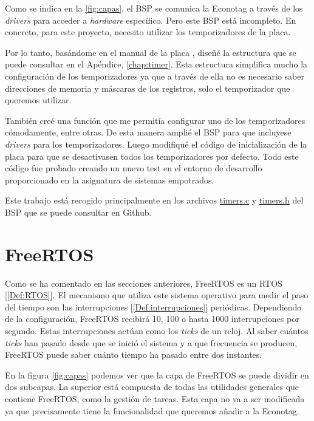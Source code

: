 Como se indica en la \autoref{fig:capas}, el BSP se comunica la Econotag a través de los \emph{drivers} para acceder a \emph{hardware} específico. Pero este BSP está incompleto. En concreto, para este proyecto, necesito utilizar los temporizadores de la placa.

Por lo tanto, basándome en el manual de la placa \cite{MC1322xRM}, diseñé la estructura que se puede consultar en el Apéndice, \autoref{chap:timer}. Esta estructura simplifica mucho la configuración de los temporizadores ya que a través de ella no es necesario saber direcciones de memoria y máscaras de los registros, solo el temporizador que queremos utilizar.

También creé una función que me permitía configurar uno de los temporizadores cómodamente, entre otras. De esta manera amplié el BSP para que incluyese \emph{drivers} para los temporizadores. Luego modifiqué el código de inicialización de la placa para que se desactivasen todos los temporizadores por defecto. Todo este código fue probado creando un nuevo test en el entorno de desarrollo proporcionado en la asignatura de sistemas empotrados.

Este trabajo está recogido principalmente en los archivos \href{https://github.com/epaubert/FreeRTOS-Kernel-TFG/blob/main/portable/GCC/ARM7_MC13224V/bsp/drivers/timers.c}{timers.c} y \href{https://github.com/epaubert/FreeRTOS-Kernel-TFG/blob/main/portable/GCC/ARM7_MC13224V/bsp/include/timers.h}{timers.h} del BSP que se puede consultar en Github.

\section{FreeRTOS}
Como se ha comentado en las secciones anteriores, FreeRTOS es un RTOS [\ref{Def:RTOS}]. El mecanismo que utiliza este sistema operativo para medir el paso del tiempo son las interrupciones [\ref{Def:interrupciones}] periódicas. Dependiendo de la configuración, FreeRTOS recibirá 10, 100 o hasta 1000 interrupciones por segundo. Estas interrupciones actúan como los \emph{ticks} de un reloj. Al saber cuántos \emph{ticks} han pasado desde que se inició el sistema y a que frecuencia se producen, FreeRTOS puede saber cuánto tiempo ha pasado entre dos instantes.

En la figura \ref{fig:capas} podemos ver que la capa de FreeRTOS se puede dividir en dos subcapas. La superior está compuesta de todas las utilidades generales que contiene FreeRTOS, como la gestión de tareas. Esta capa no va a ser modificada ya que precisamente tiene la funcionalidad que queremos añadir a la Econotag.

